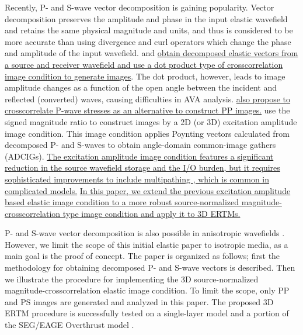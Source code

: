 \documentclass[manuscript,ulem,graphix,revised]{geophysics}
\begin{document}
Recently, P- and S-wave vector decomposition \citep{ma03,zhang07,wenlong_cmp15,wenlong_pv16,zhu17,wenlong17} is gaining popularity. Vector decomposition preserves the amplitude and phase in the input elastic wavefield and retains the same physical magnitude and units, and thus is considered to be more accurate than using divergence and curl operators which change the phase and amplitude of the input wavefield. \citet{wang_cl16} and \uline{\mbox{\citet{du17}} obtain decomposed elastic vectors from a source and receiver wavefield and use a dot product type of crosscorrelation image condition to generate images}. The dot product, however, leads to image amplitude changes as a function of the open angle between the incident and reflected (converted) waves, causing difficulties in AVA analysis. \uline{\mbox{\citet{du17}} also propose to crosscorrelate P-wave stresses as an alternative to construct PP images.} \citet{wenlong_vct15,wenlong_3d16} use the signed magnitude ratio to construct images by a 2D (or 3D) excitation amplitude image condition. 
This image condition applies Poynting vectors \citep{cerveny01} calculated from decomposed P- and S-waves to obtain angle-domain common-image gathers (ADCIGs). \marginpar{[6]} \uline{The excitation amplitude image condition \mbox{\citep{nguyen13,wenlong_vct15}}} \newline\uline{features a significant reduction in the source wavefield storage and the I/O burden, but it requires sophisticated improvements to include multipathing \mbox{\citep{jin15}}, which is common in complicated models.}\marginpar{[1,4,5,6]} \uline{In this paper, we extend the previous excitation amplitude based elastic image condition to a more robust source-normalized magnitude-crosscorrelation type image condition and apply it to 3D ERTMs.}

P- and S-wave vector decomposition is also possible in anisotropic wavefields \citep{cheng14,wenlong17}. However, we limit the scope of this initial elastic paper to isotropic media, as a main goal is the proof of concept. The paper is organized as follows; first the methodology for obtaining decomposed P- and S-wave vectors is described. Then we illustrate the procedure for implementing the 3D source-normalized magnitude-crosscorrelation elastic image condition. To limit the scope, only PP and PS images are generated and analyzed in this paper.
The proposed 3D ERTM procedure is successfully tested on a single-layer model and a portion of the SEG/EAGE Overthrust model \citep{aminzadeh94}. 
\end{document}
